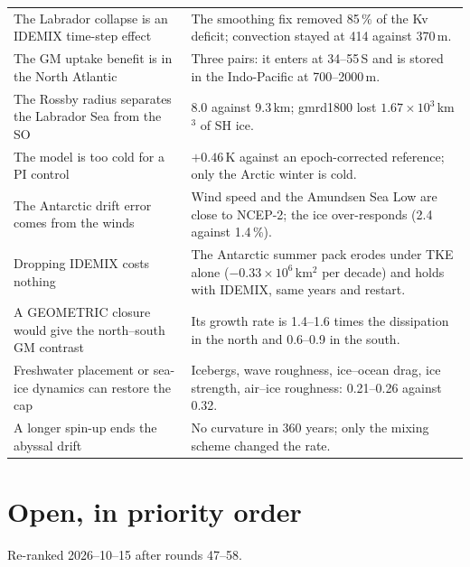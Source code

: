 \documentclass[10pt]{article}
\begin{document}
{\begin{longtable}{p{6.6cm}p{9.4cm}}
The Labrador collapse is an IDEMIX time-step effect &
The smoothing fix removed 85\,\% of the Kv deficit; convection stayed at 414 against 370\,m. \\
The GM uptake benefit is in the North Atlantic &
Three pairs: it enters at 34--55\,S and is stored in the Indo-Pacific at 700--2000\,m. \\
The Rossby radius separates the Labrador Sea from the SO &
8.0 against 9.3\,km; gmrd1800 lost $1.67\times10^3$\,km$^3$ of SH ice. \\
The model is too cold for a PI control &
$+0.46$\,K against an epoch-corrected reference; only the Arctic winter is cold. \\
The Antarctic drift error comes from the winds &
Wind speed and the Amundsen Sea Low are close to NCEP-2; the ice over-responds (2.4 against
1.4\,\%). \\
Dropping IDEMIX costs nothing &
The Antarctic summer pack erodes under TKE alone ($-0.33\times10^6$\,km$^2$ per decade) and holds with
IDEMIX, same years and restart. \\
A GEOMETRIC closure would give the north--south GM contrast &
Its growth rate is 1.4--1.6 times the dissipation in the north and 0.6--0.9 in the south. \\
Freshwater placement or sea-ice dynamics can restore the cap &
Icebergs, wave roughness, ice--ocean drag, ice strength, air--ice roughness: 0.21--0.26 against 0.32. \\
A longer spin-up ends the abyssal drift &
No curvature in 360 years; only the mixing scheme changed the rate. \\
\bottomrule
\end{longtable}}

\section{Open, in priority order}\label{sec:open}

Re-ranked 2026--10--15 after rounds 47--58.
\end{document}
